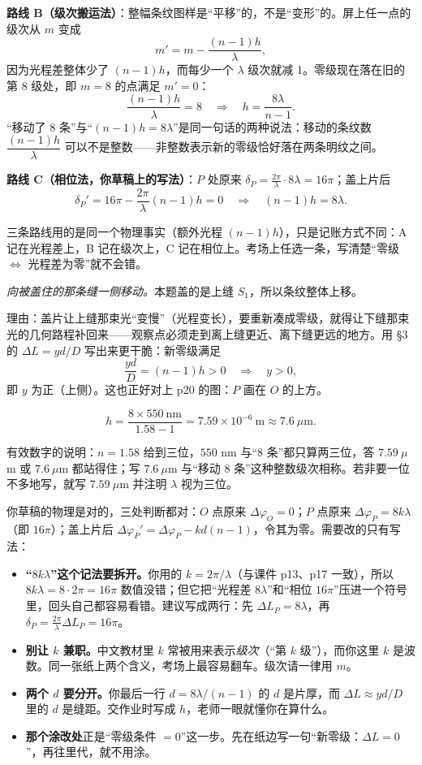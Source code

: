 \documentclass[11pt]{ctexart}
\begin{document}
\textbf{路线 B（级次搬运法）}：整幅条纹图样是“平移”的，不是“变形”的。屏上任一点的级次从 $m$ 变成
\[
m'=m-\frac{(n-1)h}{\lambda},
\]
因为光程差整体少了 $(n-1)h$，而每少一个 $\lambda$ 级次就减 1。零级现在落在旧的第 8 级处，即 $m=8$ 的点满足 $m'=0$：
\[
\frac{(n-1)h}{\lambda}=8\quad\Longrightarrow\quad h=\frac{8\lambda}{n-1}.
\]
“移动了 8 条”与“$(n-1)h=8\lambda$”是同一句话的两种说法：移动的条纹数 $\dfrac{(n-1)h}{\lambda}$ 可以不是整数——非整数表示新的零级恰好落在两条明纹之间。

\textbf{路线 C（相位法，你草稿上的写法）}：$P$ 处原来 $\delta_P=\frac{2\pi}{\lambda}\cdot8\lambda=16\pi$；盖上片后
\[
\delta_P'=16\pi-\frac{2\pi}{\lambda}(n-1)h=0\quad\Longrightarrow\quad (n-1)h=8\lambda .
\]

三条路线用的是同一个物理事实（额外光程 $(n-1)h$），只是记账方式不同：A 记在光程差上，B 记在级次上，C 记在相位上。考场上任选一条，写清楚“零级 $\Leftrightarrow$ 光程差为零”就不会错。


\emph{向被盖住的那条缝一侧移动。}本题盖的是上缝 $S_1$，所以条纹整体上移。

理由：盖片让上缝那束光“变慢”（光程变长），要重新凑成零级，就得让下缝那束光的几何路程补回来——观察点必须走到离上缝更近、离下缝更远的地方。用 \S3 的 $\Delta L=yd/D$ 写出来更干脆：新零级满足
\[
\frac{yd}{D}=(n-1)h>0\quad\Longrightarrow\quad y>0 ,
\]
即 $y$ 为正（上侧）。这也正好对上 p20 的图：$P$ 画在 $O$ 的上方。

\[
h=\frac{8\times550\ \mathrm{nm}}{1.58-1}=7.59\times10^{-6}\ \mathrm{m}\approx7.6\ \mu\mathrm{m}.
\]

有效数字的说明：$n=1.58$ 给到三位，$550$ nm 与“8 条”都只算两三位，答 $7.59\ \mu$m 或 $7.6\ \mu$m 都站得住；写 $7.6\ \mu$m 与“移动 8 条”这种整数级次相称。若非要一位不多地写，就写 $7.59\ \mu$m 并注明 $\lambda$ 视为三位。


你草稿的物理是对的，三处判断都对：$O$ 点原来 $\Delta\varphi_O=0$；$P$ 点原来 $\Delta\varphi_P=8k\lambda$（即 $16\pi$）；盖上片后 $\Delta\varphi_P'=\Delta\varphi_P-kd(n-1)$，令其为零。需要改的只有写法：

\begin{itemize}
\item \textbf{“$8k\lambda$”这个记法要拆开。}你用的 $k=2\pi/\lambda$（与课件 p13、p17 一致），所以 $8k\lambda=8\cdot2\pi=16\pi$ 数值没错；但它把“光程差 $8\lambda$”和“相位 $16\pi$”压进一个符号里，回头自己都容易看错。建议写成两行：先 $\Delta L_P=8\lambda$，再 $\delta_P=\frac{2\pi}{\lambda}\Delta L_P=16\pi$。
\item \textbf{别让 $k$ 兼职。}中文教材里 $k$ 常被用来表示\emph{级次}（“第 $k$ 级”），而你这里 $k$ 是波数。同一张纸上两个含义，考场上最容易翻车。级次请一律用 $m$。
\item \textbf{两个 $d$ 要分开。}你最后一行 $d=8\lambda/(n-1)$ 的 $d$ 是片厚，而 $\Delta L\approx yd/D$ 里的 $d$ 是缝距。交作业时写成 $h$，老师一眼就懂你在算什么。
\item \textbf{那个涂改处}正是“零级条件 $=0$”这一步。先在纸边写一句“新零级：$\Delta L=0$”，再往里代，就不用涂。
\end{itemize}
\end{document}
